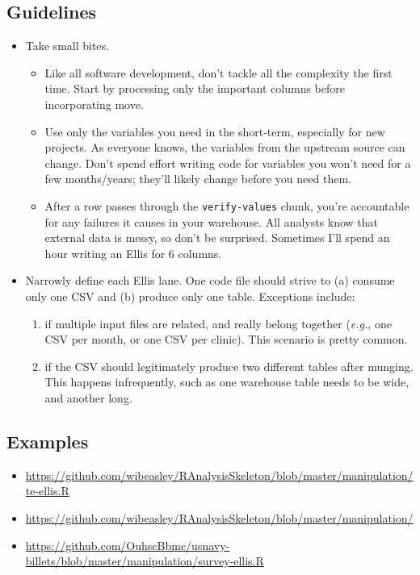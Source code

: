 \documentclass[
]{book}
\providecommand{\tightlist}{%
  \setlength{\itemsep}{0pt}\setlength{\parskip}{0pt}}
\begin{document}
\hypertarget{guidelines}{%
\subsection{Guidelines}\label{guidelines}}

\begin{itemize}
\tightlist
\item
  Take small bites.

  \begin{itemize}
  \tightlist
  \item
    Like all software development, don't tackle all the complexity the first time. Start by processing only the important columns before incorporating move.
  \item
    Use only the variables you need in the short-term, especially for new projects. As everyone knows, the variables from the upstream source can change. Don't spend effort writing code for variables you won't need for a few months/years; they'll likely change before you need them.
  \item
    After a row passes through the \texttt{verify-values} chunk, you're accountable for any failures it causes in your warehouse. All analysts know that external data is messy, so don't be surprised. Sometimes I'll spend an hour writing an Ellis for 6 columns.
  \end{itemize}
\item
  Narrowly define each Ellis lane. One code file should strive to (a) consume only one CSV and (b) produce only one table. Exceptions include:

  \begin{enumerate}
  \def\labelenumi{\arabic{enumi}.}
  \tightlist
  \item
    if multiple input files are related, and really belong together (\emph{e.g.}, one CSV per month, or one CSV per clinic). This scenario is pretty common.
  \item
    if the CSV should legitimately produce two different tables after munging. This happens infrequently, such as one warehouse table needs to be wide, and another long.
  \end{enumerate}
\end{itemize}

\hypertarget{examples}{%
\subsection{Examples}\label{examples}}

\begin{itemize}
\tightlist
\item
  \url{https://github.com/wibeasley/RAnalysisSkeleton/blob/master/manipulation/te-ellis.R}
\item
  \url{https://github.com/wibeasley/RAnalysisSkeleton/blob/master/manipulation/}
\item
  \url{https://github.com/OuhscBbmc/usnavy-billets/blob/master/manipulation/survey-ellis.R}
\end{itemize}
\end{document}
